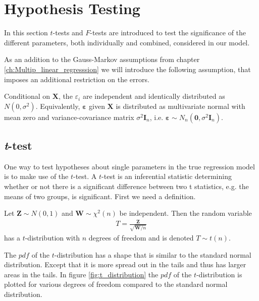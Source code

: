 \section{Hypothesis Testing}
In this section $t$-tests and $F$-tests are introduced to test the significance of the different parameters, both individually and combined, considered in our model. 


As an addition to the Gauss-Markov assumptions from chapter \ref{ch:Multip_linear_regresssion} we will introduce the following assumption, that imposes an additional restriction on the errors. 
\begin{assumption} \label{as:normality_of_errors}
    Conditional on $\mathbf{X}$, the $\varepsilon_i$ are independent and identically distributed as $N(0, \sigma^2)$. Equivalently, $\boldsymbol{\varepsilon}$ given $\mathbf{X}$ is distributed as multivariate normal with mean zero and variance-covariance matrix $\sigma^2 \mathbf{I}_{n}$, i.e. $\boldsymbol{\varepsilon} \sim N_n(\mathbf{0}, \sigma^2 \mathbf{I}_{n})$.
\end{assumption}

\subsection{\textit{t}-test}
One way to test hypotheses about single parameters in the true regression model is to make use of the $t$-test. 
A $t$-test is an inferential statistic determining whether or not there is a significant difference between two t statistics, e.g.$\!$ the means of two groups, is significant. First we need a definition.

\begin{definition}\label{def:t_distribution}
    Let $\textbf{Z} \sim N(0,1)$ and $\textbf{W} \sim \chi^2(n)$ be independent. Then the random variable
    \begin{align*}
       T = \frac{\textbf{Z}}{\sqrt{\textbf{W}/n}}
    \end{align*}
    has a $t$-distribution with $n$ degrees of freedom and is denoted $T \sim t(n)$.
\end{definition}

The $pdf$ of the $t$-distribution has a shape that is similar to the standard normal distribution. 
Except that it is more spread out in the tails and thus has larger areas in the tails. 
In figure \ref{fig:t_distribution} the $pdf$ of the $t$-distribution is plotted for various degrees of freedom compared to the standard normal distribution. 

